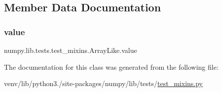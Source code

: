 \subsection{Member Data Documentation}
\mbox{\label{classnumpy_1_1lib_1_1tests_1_1test__mixins_1_1ArrayLike_ac5acddeb17e575b5e83300b00d5fdfd0}} 
\subsubsection{\texorpdfstring{value}{value}}
{\footnotesize\ttfamily numpy.\+lib.\+tests.\+test\+\_\+mixins.\+Array\+Like.\+value}



The documentation for this class was generated from the following file\+:\begin{DoxyCompactItemize}
\item 
venv/lib/python3./site-\/packages/numpy/lib/tests/\hyperlink{test__mixins_8py}{test\+\_\+mixins.\+py}\end{DoxyCompactItemize}
